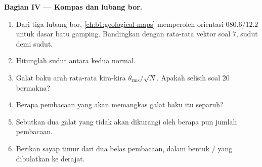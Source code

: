 \begin{problem}
\medskip
\noindent\textbf{Bagian IV --- Kompas dan lubang bor.}
\begin{enumerate}[resume]
  \item Dari tiga lubang bor, \cref{ch:b1:geological-maps} memperoleh orientasi $080.6/12.2$ untuk dasar batu gamping. Bandingkan dengan rata-rata vektor soal 7, sudut demi sudut.
  \item Hitunglah sudut antara kedua normal.
  \item Galat baku arah rata-rata kira-kira $\theta_{\text{rms}}/\sqrt N$. Apakah selisih soal 20 bermakna?
  \item Berapa pembacaan yang akan memangkas galat baku itu separuh?
  \item Sebutkan dua galat yang tidak akan dikurangi oleh berapa pun jumlah pembacaan.
  \item Berikan  sayap timur dari dua belas pembacaan, dalam bentuk / yang dibulatkan ke derajat.
\end{enumerate}
\end{problem}
